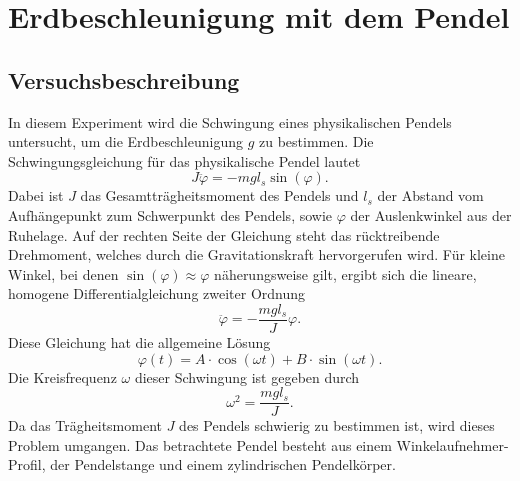 \section{Erdbeschleunigung mit dem Pendel}


\subsection{Versuchsbeschreibung}

In diesem Experiment wird die Schwingung eines physikalischen Pendels untersucht, um die Erdbeschleunigung $g$ zu bestimmen. Die Schwingungsgleichung für das physikalische Pendel lautet
$$J \ddot \varphi = - mgl_s \sin(\varphi)\text{.}$$
Dabei ist $J$ das Gesamtträgheitsmoment des Pendels und $l_s$ der Abstand vom Aufhängepunkt zum Schwerpunkt des Pendels, sowie $\varphi$ der Auslenkwinkel aus der Ruhelage. Auf der rechten Seite der Gleichung steht das rücktreibende Drehmoment, welches durch die Gravitationskraft hervorgerufen wird. Für kleine Winkel, bei denen $\sin(\varphi) \approx \varphi$ näherungsweise gilt, ergibt sich die lineare, homogene Differentialgleichung zweiter Ordnung
$$\ddot \varphi = -\frac{mgl_s}J \varphi\text{.}$$
Diese Gleichung hat die allgemeine Lösung
$$\varphi(t) = A\cdot \cos(\omega t)+ B\cdot \sin(\omega t)\text{.}$$
Die Kreisfrequenz $\omega$ dieser Schwingung ist gegeben durch
$$\omega^2 = \frac{mgl_s}J\text{.}$$
Da das Trägheitsmoment $J$ des Pendels schwierig zu bestimmen ist, wird dieses Problem umgangen. Das betrachtete Pendel besteht aus einem Winkelaufnehmer-Profil, der Pendelstange und einem zylindrischen Pendelkörper.

